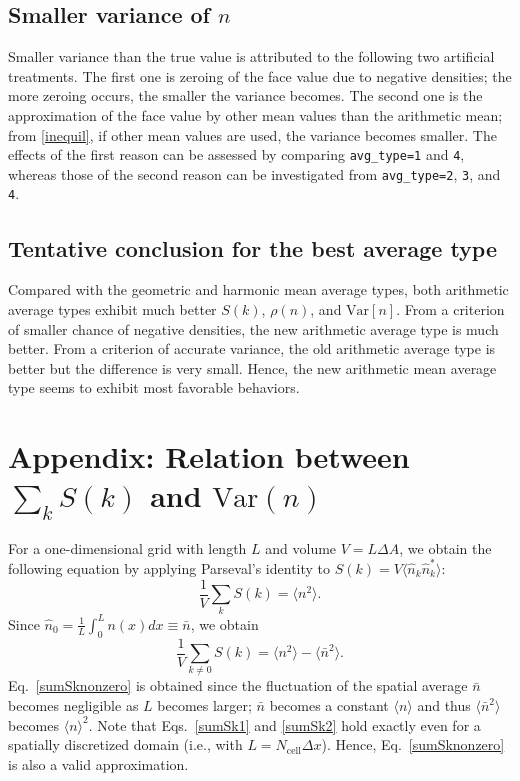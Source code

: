 \documentclass{article}
\begin{document}
\subsection{Smaller variance of $n$}

Smaller variance than the true value is attributed to the following two artificial treatments.
The first one is zeroing of the face value due to negative densities; the more zeroing occurs, the smaller the variance becomes.
The second one is the approximation of the face value by other mean values than the arithmetic mean;
from \eqref{inequil}, if other mean values are used, the variance becomes smaller. 
The effects of the first reason can be assessed by comparing \texttt{avg\_type=1} and \texttt{4}, whereas those of the second reason can be investigated from \texttt{avg\_type=2}, \texttt{3}, and \texttt{4}.

\subsection{Tentative conclusion for the best average type}

Compared with the geometric and harmonic mean average types, both arithmetic average types exhibit much better $S(k)$, $\rho(n)$, and $\mathrm{Var}[n]$.
From a criterion of smaller chance of negative densities, the new arithmetic average type is much better.
From a criterion of accurate variance, the old arithmetic average type is better but the difference is very small.
Hence, the new arithmetic mean average type seems to exhibit most favorable behaviors.

\section*{Appendix: Relation between $\sum_{k}S(k)$ and $\mathrm{Var}(n)$}

For a one-dimensional grid with length $L$ and volume $V=L\Delta A$, we obtain the following equation by applying Parseval's identity to $S(k)=V\langle \hat{n}_k \hat{n}_k^* \rangle$:
\begin{equation}
\label{sumSk1}
\frac{1}{V}\sum_k S(k) = \langle n^2 \rangle.
\end{equation}
Since $\hat{n}_0=\frac{1}{L}\int_0^L n(x) dx \equiv \bar{n}$, we obtain
\begin{equation}
\label{sumSk2}
\frac{1}{V}\sum_{k\ne0}S(k)=\langle n^2\rangle-\langle \bar{n}^2\rangle.
\end{equation}
Eq.~\eqref{sumSknonzero} is obtained since the fluctuation of the spatial average $\bar{n}$ becomes negligible as $L$ becomes larger; $\bar{n}$ becomes a constant $\langle n\rangle$ and thus $\langle \bar{n}^2 \rangle$ becomes $\langle n\rangle^2$.
Note that Eqs.~\eqref{sumSk1} and \eqref{sumSk2} hold exactly even for a spatially discretized domain (i.e., with $L=N_\mathrm{cell}\Delta x$).
Hence, Eq.~\eqref{sumSknonzero} is also a valid approximation.
\end{document}
